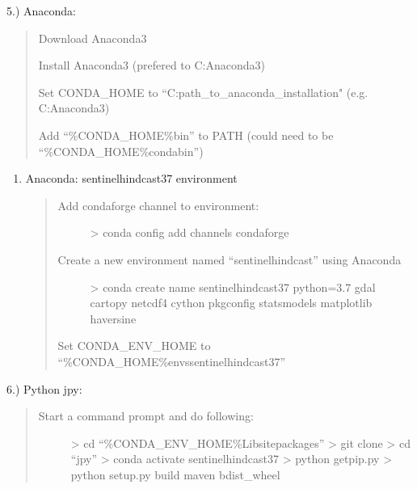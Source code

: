 \documentclass[letterpaper,10pt,english]{sphinxmanual}
\begin{document}
5.) Anaconda: 
\begin{quote}

Download Anaconda3

Install Anaconda3 (prefered to C:Anaconda3)

Set CONDA\_HOME to “C:path\_to\_anaconda\_installation" (e.g. C:Anaconda3)

Add “\%CONDA\_HOME\%bin” to PATH  (could need to be “\%CONDA\_HOME\%condabin”)
\end{quote}
\begin{enumerate}
%
\setcounter{enumi}{5}
\item {} 
Anaconda: sentinel\sphinxhyphen{}hindcast\sphinxhyphen{}37 environment
\begin{quote}
\begin{description}
\item[{Add conda\sphinxhyphen{}forge channel to environment:}] \leavevmode
\textgreater{} conda config \textendash{}add channels conda\sphinxhyphen{}forge

\item[{Create a new environment named “sentinel\sphinxhyphen{}hindcast” using Anaconda}] \leavevmode
\textgreater{} conda create \textendash{}name sentinel\sphinxhyphen{}hindcast\sphinxhyphen{}37 python=3.7 gdal cartopy netcdf4 cython pkgconfig statsmodels matplotlib haversine

\end{description}

Set CONDA\_ENV\_HOME to “\%CONDA\_HOME\%envssentinel\sphinxhyphen{}hindcast\sphinxhyphen{}37”
\end{quote}

\end{enumerate}

6.) Python \sphinxhyphen{} jpy: 
\begin{quote}
\begin{description}
\item[{Start a command prompt and do following:}] \leavevmode
\textgreater{} cd “\%CONDA\_ENV\_HOME\%Libsite\sphinxhyphen{}packages”
\textgreater{} git clone 
\textgreater{} cd “jpy”
\textgreater{} conda activate sentinel\sphinxhyphen{}hindcast\sphinxhyphen{}37
\textgreater{} python get\sphinxhyphen{}pip.py
\textgreater{} python setup.py build maven bdist\_wheel

\end{description}
\end{quote}
\end{document}
